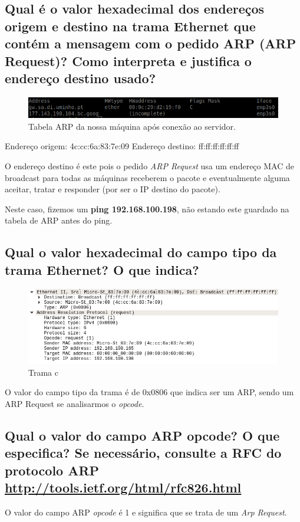 \documentclass[a4paper]{article}
\begin{document}
\subsection{Qual é o valor hexadecimal dos endereços origem e destino na trama Ethernet
que contém a mensagem com o pedido ARP (ARP Request)? Como interpreta e
justifica o endereço destino usado?}
\begin{figure}[H]
\centering
\includegraphics[scale=0.50]{pics/p10.png}
\caption{Tabela ARP da nossa máquina após conexão ao servidor.}
\end{figure}
Endereço origem: 4c:cc:6a:83:7e:09
Endereço destino: ff:ff:ff:ff:ff:ff 

O endereço destino é este pois o pedido \textit{ARP Request} usa um endereço MAC de broadcast para todas as máquinas receberem o pacote e eventualmente alguma aceitar, tratar e responder (por ser o IP destino do pacote).

Neste caso, fizemos um \textbf{ping 192.168.100.198}, não estando este guardado na tabela de ARP antes do ping.

\subsection{Qual o valor hexadecimal do campo tipo da trama Ethernet? O que indica?}
\begin{figure}[H]
\centering
\includegraphics[scale=0.540]{pics/p10-1.png}
\caption{Trama c}
\end{figure}
O valor do campo tipo da trama é de 0x0806 que indica ser um ARP, sendo um ARP Request se analisarmos o \textit{opcode}.

\subsection{Qual o valor do campo ARP opcode? O que especifica? Se necessário, consulte a RFC do protocolo ARP \url{http://tools.ietf.org/html/rfc826.html}}
O valor do campo ARP \textit{opcode} é 1 e significa que se trata de um \textit{Arp Request}.
\end{document}
